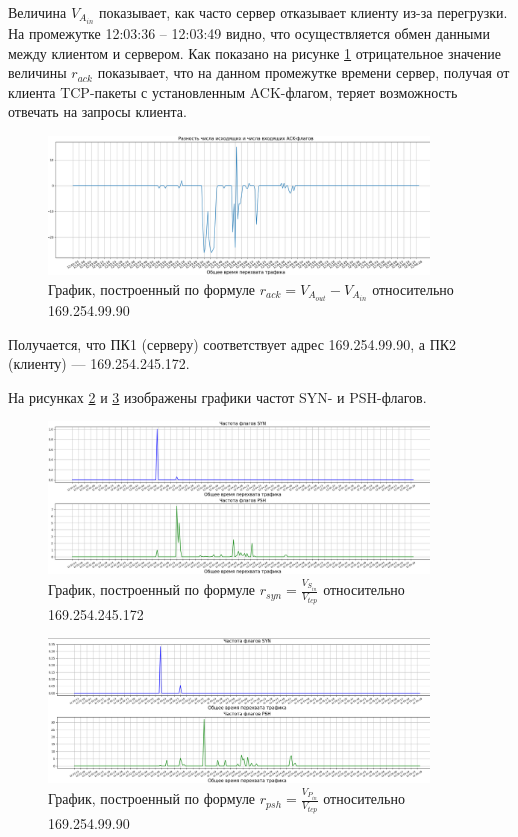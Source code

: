 \documentclass[bachelor, och, coursework]{SCWorks}
\begin{document}
  Величина $V_{A_{in}}$ показывает, как часто сервер отказывает клиенту из-за перегрузки. На промежутке 12:03:36 -- 12:03:49 видно, что 
  осуществляется обмен данными между клиентом и сервером. Как показано на рисунке \ref{serv3} отрицательное значение величины $r_{ack}$
  показывает, что на данном промежутке времени сервер, получая от клиента TCP-пакеты с установленным ACK-флагом, теряет возможность
  отвечать на запросы клиента. 

  \begin{figure}[H]
    \centering
    \includegraphics[width=0.9\textwidth]{photo/serv3.png}
    \caption{График, построенный по формуле $r_{ack} = V_{A_{out}} - V_{A_{in}}$ относительно 169.254.99.90}
    \label{serv3}
  \end{figure}

  Получается, что ПК1 (серверу) соответствует адрес 169.254.99.90, а ПК2 (клиенту) --- 169.254.245.172.

  На рисунках \ref{clnt4} и \ref{serv4} изображены графики частот SYN- и PSH-флагов.

  \begin{figure}[H]
    \centering
    \includegraphics[width=0.9\textwidth]{photo/clnt4.png}
    \caption{График, построенный по формуле $r_{syn} = \frac{V_{S_{in}}}{V_{tcp}}$ относительно 169.254.245.172}
    \label{clnt4}
  \end{figure}

  \begin{figure}[H]
    \centering
    \includegraphics[width=0.9\textwidth]{photo/serv4.png}
    \caption{График, построенный по формуле $r_{psh} = \frac{V_{P_{in}}}{V_{tcp}}$ относительно 169.254.99.90}
    \label{serv4}
  \end{figure}
\end{document}
